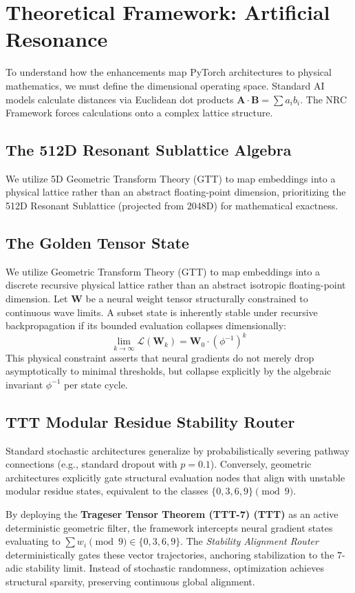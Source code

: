 \section{Theoretical Framework: Artificial Resonance}

To understand how the enhancements map PyTorch architectures to physical mathematics, we must define the dimensional operating space. Standard AI models calculate distances via Euclidean dot products $\mathbf{A} \cdot \mathbf{B} = \sum a_i b_i$. The NRC Framework forces calculations onto a complex lattice structure.

\subsection{The 512D Resonant Sublattice Algebra}
We utilize 5D Geometric Transform Theory (GTT) to map embeddings into a physical lattice rather than an abstract floating-point dimension, prioritizing the 512D Resonant Sublattice (projected from 2048D) for mathematical exactness.

\subsection{The Golden Tensor State}
We utilize Geometric Transform Theory (GTT) to map embeddings into a discrete recursive physical lattice rather than an abstract isotropic floating-point dimension. Let $\mathbf{W}$ be a neural weight tensor structurally constrained to continuous wave limits. A subset state is inherently stable under recursive backpropagation if its bounded evaluation collapses dimensionally:
\begin{equation}
	\lim_{k \to \infty} \mathcal{L}(\mathbf{W}_{k}) = \mathbf{W}_0 \cdot (\phi^{-1})^k
\end{equation}
This physical constraint asserts that neural gradients do not merely drop asymptotically to minimal thresholds, but collapse explicitly by the algebraic invariant $\phi^{-1}$ per state cycle.

\subsection{TTT Modular Residue Stability Router}
Standard stochastic architectures generalize by probabilistically severing pathway connections (e.g., standard dropout with $p=0.1$). Conversely, geometric architectures explicitly gate structural evaluation nodes that align with unstable modular residue states, equivalent to the classes $\{0, 3, 6, 9\} \pmod 9$.

By deploying the \textbf{Trageser Tensor Theorem (TTT-7) (TTT)} as an active deterministic geometric filter, the framework intercepts neural gradient states evaluating to $\sum w_i \pmod{9} \in \{0, 3, 6, 9\}$. The \textit{Stability Alignment Router} deterministically gates these vector trajectories, anchoring stabilization to the $7$-adic stability limit. Instead of stochastic randomness, optimization achieves structural sparsity, preserving continuous global alignment.
